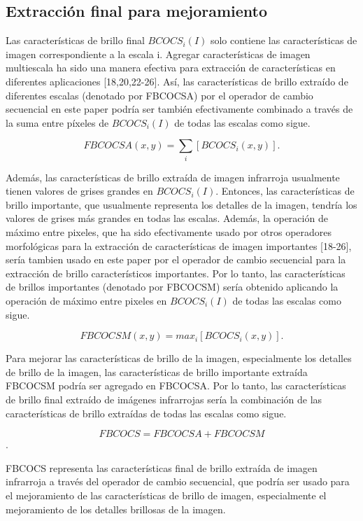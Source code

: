 \documentclass[a4paper, 11 pt, conference]{ieeeconf}      %
\begin{document}
\subsection{Extracci\'on final para mejoramiento}

Las caracter\'isticas de brillo final $BCOCS_i(I)$ solo contiene las caracter\'isticas de imagen correspondiente a la escala i. Agregar  caracter\'isticas de imagen multiescala ha sido una manera efectiva para extracci\'on de caracter\'isticas en diferentes aplicaciones [18,20,22-26]. As\'i, las caracter\'isticas de brillo extra\'ido de diferentes escalas (denotado por FBCOCSA) por el operador de cambio secuencial en este paper podr\'ia ser tambi\'en efectivamente combinado a trav\'es de la suma entre p\'ixeles de $BCOCS_i(I)$ de todas las escalas como sigue.

$$
FBCOCSA(x,y) = \sum_{i} [BCOCS_i(x,y)].
$$

Adem\'as, las caracter\'isticas de brillo extra\'ida de imagen infrarroja usualmente tienen valores de grises grandes en $BCOCS_i(I)$. Entonces, las caracter\'isticas de brillo importante, que usualmente representa los detalles de la imagen, tendr\'ia los valores de grises m\'as grandes en todas las escalas. Adem\'as, la operaci\'on de m\'aximo entre pixeles, que ha sido efectivamente usado por otros operadores morfol\'ogicas para la extracci\'on de caracter\'isticas de imagen importantes [18-26], ser\'ia tambien usado en este paper por el operador de cambio secuencial para la extracci\'on de brillo caracter\'isticos importantes. Por lo tanto, las caracter\'isticas de brillos importantes (denotado por FBCOCSM) ser\'ia obtenido aplicando la operaci\'on de m\'aximo entre pixeles en $BCOCS_i(I)$ de todas las escalas como sigue.

$$
FBCOCSM(x,y) = max_i[BCOCS_i(x,y)].
$$

Para mejorar las caracter\'isticas de brillo de la imagen, especialmente los detalles de brillo de la imagen, las caracter\'isticas de brillo importante extra\'ida FBCOCSM podr\'ia ser agregado en FBCOCSA. Por lo tanto, las caracter\'isticas de brillo final extra\'ido de im\'agenes infrarrojas ser\'ia la combinaci\'on de las caracter\'isticas de brillo extra\'idas de todas las escalas como sigue.

$$FBCOCS = FBCOCSA + FBCOCSM$$.

FBCOCS representa las caracter\'isticas final de brillo extra\'ida de imagen infrarroja a trav\'es del operador de cambio secuencial, que podr\'ia ser usado para el mejoramiento de las caracter\'isticas de brillo de imagen, especialmente el mejoramiento de los detalles brillosas de la imagen.
\end{document}
